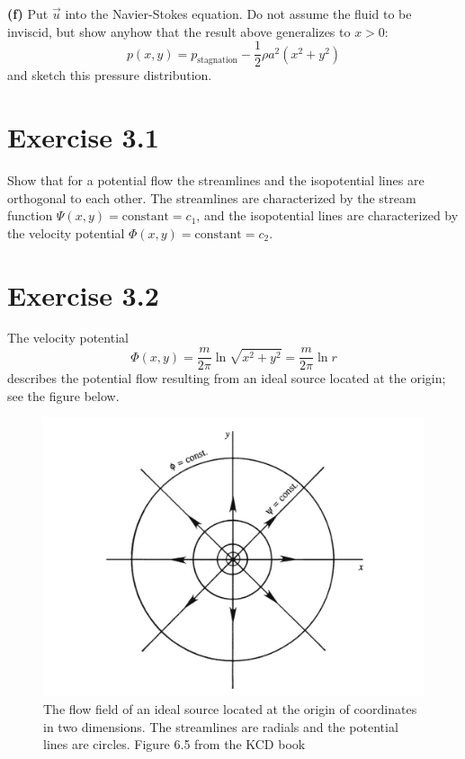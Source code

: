 \documentclass[a4paper, 10pt]{article}
\begin{document}
{\bf (f)} Put $\vec{u}$ into the Navier-Stokes equation. Do not assume the fluid to be inviscid, but show anyhow that the result above generalizes to $x>0$:
\begin{equation}
p(x,y) = p_\mathrm{stagnation}-\frac{1}{2}\rho a^2 (x^2+y^2)
\end{equation}
and sketch this pressure distribution.


\newpage


\section{Exercise 3.1}
Show that for a potential flow the streamlines and the isopotential lines are orthogonal to each other. The streamlines are characterized by the stream function $\Psi(x,y)=\mathrm{constant}=c_1$, and the isopotential lines are characterized by the velocity potential $\Phi(x,y)=\mathrm{constant}=c_2$.

\section{Exercise 3.2}
The velocity potential
\begin{equation}
\Phi(x,y) = \frac{m}{2\pi}\ln\sqrt{x^2+y^2}=\frac{m}{2\pi}\ln r
\end{equation}
describes the potential flow resulting from an ideal source located at the origin; see the figure below.

\begin{figure}[h!]
	\centering
	\includegraphics[width=.75\textwidth]{kcd}
	\caption{The flow field of an ideal source located at the origin of coordinates in two dimensions. The streamlines are radials and the potential lines are circles. Figure 6.5 from the KCD book}
\end{figure}
\end{document}
